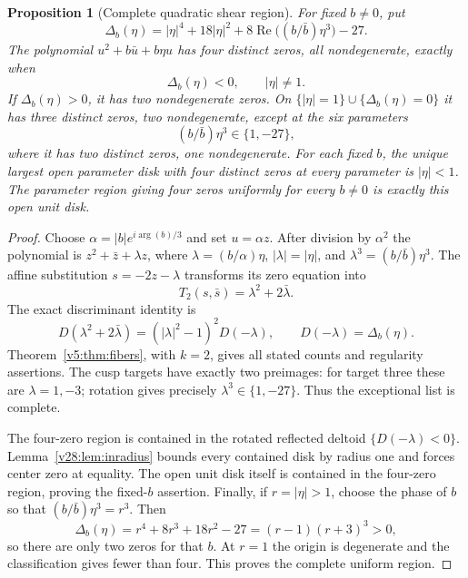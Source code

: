 \documentclass[UTF8,11pt]{ctexart}
\newtheorem{prop}[thm]{Proposition}
\theoremstyle{definition}
\numberwithin{equation}{section}
\DeclareMathOperator{\Rea}{Re}\DeclareMathOperator{\Ima}{Im}
\begin{document}
\begin{prop}[Complete quadratic shear region]
\label{v30:prop:quadraticregion}
For fixed $b\ne0$, put
\[
 \Delta_b(\eta)=|\eta|^4+18|\eta|^2
                 +8\Rea\bigl((b/\bar b)\eta^3\bigr)-27.
\]
The polynomial $u^2+b\bar u+b\eta u$ has four distinct zeros,
all nondegenerate, exactly when
\[
                 \Delta_b(\eta)<0,\qquad |\eta|\ne1.
\]
If $\Delta_b(\eta)>0$, it has two nondegenerate zeros.
On $\{|\eta|=1\}\cup\{\Delta_b(\eta)=0\}$ it has three
distinct zeros, two nondegenerate, except at the six parameters
\[
                  (b/\bar b)\eta^3\in\{1,-27\},
\]
where it has two distinct zeros, one nondegenerate.
For each fixed $b$, the unique largest open parameter disk with
four distinct zeros at every parameter is $|\eta|<1$.
The parameter region giving four zeros uniformly for every $b\ne0$
is exactly this open unit disk.
\end{prop}
\begin{proof}
Choose $\alpha=|b|e^{i\arg(b)/3}$ and set $u=\alpha z$.
After division by $\alpha^2$ the polynomial is
$z^2+\bar z+\lambda z$, where
$\lambda=(b/\alpha)\eta$, $|\lambda|=|\eta|$, and
$\lambda^3=(b/\bar b)\eta^3$.
The affine substitution $s=-2z-\lambda$ transforms its zero
equation into
\[
 T_2(s,\bar s)=\lambda^2+2\bar\lambda.
\]
The exact discriminant identity is
\[
 D(\lambda^2+2\bar\lambda)
       =(|\lambda|^2-1)^2D(-\lambda),\qquad
 D(-\lambda)=\Delta_b(\eta).
\]
Theorem~\ref{v5:thm:fibers}, with $k=2$, gives all stated
counts and regularity assertions. The cusp targets have exactly
two preimages: for target three these are $\lambda=1,-3$;
rotation gives precisely $\lambda^3\in\{1,-27\}$.
Thus the exceptional list is complete.

The four-zero region is contained in the rotated reflected deltoid
$\{D(-\lambda)<0\}$. Lemma~\ref{v28:lem:inradius} bounds every
contained disk by radius one and forces center zero at equality.
The open unit disk itself is contained in the four-zero region,
proving the fixed-$b$ assertion. Finally, if $r=|\eta|>1$,
choose the phase of $b$ so that $(b/\bar b)\eta^3=r^3$.
Then
\[
 \Delta_b(\eta)=r^4+8r^3+18r^2-27=(r-1)(r+3)^3>0,
\]
so there are only two zeros for that $b$. At $r=1$ the origin
is degenerate and the classification gives fewer than four.
This proves the complete uniform region.
\end{proof}
\end{document}
